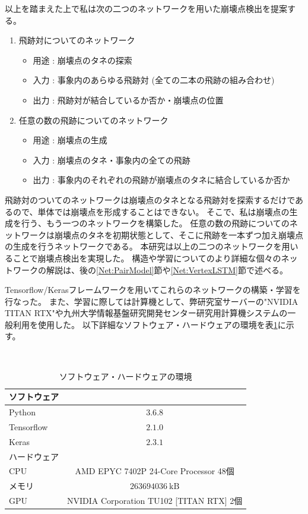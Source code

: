 以上を踏まえた上で私は次の二つのネットワークを用いた崩壊点検出を提案する。

\begin{enumerate}
 \item 飛跡対についてのネットワーク
 \begin{itemize}
  \item 用途 : 崩壊点のタネの探索
  \item 入力 : 事象内のあらゆる飛跡対 (全ての二本の飛跡の組み合わせ)
  \item 出力 : 飛跡対が結合しているか否か・崩壊点の位置
 \end{itemize}
 \item 任意の数の飛跡についてのネットワーク
 \begin{itemize}
  \item 用途 : 崩壊点の生成
  \item 入力 : 崩壊点のタネ・事象内の全ての飛跡
  \item 出力 : 事象内のそれぞれの飛跡が崩壊点のタネに結合しているか否か
 \end{itemize}
\end{enumerate}

飛跡対のついてのネットワークは崩壊点のタネとなる飛跡対を探索するだけであるので、単体では崩壊点を形成することはできない。
そこで、私は崩壊点の生成を行う、もう一つのネットワークを構築した。
任意の数の飛跡についてのネットワークは崩壊点のタネを初期状態として、そこに飛跡を一本ずつ加え崩壊点の生成を行うネットワークである。
本研究は以上の二つのネットワークを用いることで崩壊点検出を実現した。
構造や学習についてのより詳細な個々のネットワークの解説は、後の\ref{Net:PairModel}節や\ref{Net:VertexLSTM}節で述べる。

Tensorflow/Kerasフレームワークを用いてこれらのネットワークの構築・学習を行なった。
また、学習に際しては計算機として、弊研究室サーバーの"NVIDIA TITAN RTX"や九州大学情報基盤研究開発センター研究用計算機システムの一般利用を使用した。
以下詳細なソフトウェア・ハードウェアの環境を表\ref{SoftwareHardwareEnvironments}に示す。

\begin{table}[htb]
 \centering
　\small
  \begin{tabular}{l c} \hline
    ソフトウェア&\\\hline\hline
    Python & $3.6.8$\\
    Tensorflow & $2.1.0$\\
    Keras & $2.3.1$\\\hline
    ハードウェア &\\\hline\hline
    CPU& AMD EPYC 7402P 24-Core Processor 48個\\
    メモリ & $263694036\ \mathrm{kB}$\\
    GPU & NVIDIA Corporation TU102 [TITAN RTX] 2個\\\hline
  \end{tabular}
  \caption{ソフトウェア・ハードウェアの環境}
  \label{SoftwareHardwareEnvironments}
\end{table}


